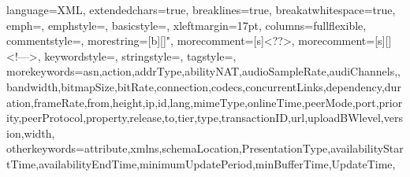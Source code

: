 \newcommand*{\chapnumfont}{%
  \usefont{T1}{pbk}{b}{n}
  \fontsize{150}{130}
  \selectfont
  \color{chaptergrey}
}
\makeatletter
\def\@makechapterhead#1{%
  \vspace*{50\p@}%
  {\parindent \z@ \raggedright \normalfont
    {\chapnumfont\ifnum \c@secnumdepth >\m@ne
        \raggedleft\bfseries \thechapter
        \par\nobreak
        \vskip 20\p@
    \fi}
    \interlinepenalty\@M
    {\raggedleft\Huge \bfseries #1\par\nobreak}
    \vskip 40\p@
  }}
\makeatother
\newcommand{\fancychapter}[1]{\chapter{#1}\vfill\minitoc\pagebreak}
%
\newcommand{\hlinew}[1]{%
  \noalign{\ifnum0=`}\fi\hrule \@height #1 \futurelet
   \reserved@a\@xhline}
%   
\def\Mark#1{\raisebox{0pt}[0pt][0pt]{\textsuperscript{\footnotesize\ensuremath{\ifcase#1\or *\or \dagger\or \ddagger\or%
    \mathsection\or \mathparagraph\or \|\or **\or \dagger\dagger%
    \or \ddagger\ddagger \else\textsuperscript{\expandafter\romannumeral#1}\fi}}}}
%
 {
	language=XML,
	extendedchars=true, 
	breaklines=true,
	breakatwhitespace=true,
	emph={},
	emphstyle=\color{red},
	basicstyle=\small,
	xleftmargin=17pt,
	columns=fullflexible,
	commentstyle=\color{gray}\upshape,
	morestring=[b][\color{brown}]",
	morecomment=[s]{<?}{?>},
	morecomment=[s][\color{forestgreen}]{<!--}{-->},
	keywordstyle=\color{orangered},
	stringstyle=\ttfamily\color{black},
	tagstyle=\color{blue},
	morekeywords={asn,action,addrType,abilityNAT,audioSampleRate,audiChannels,,bandwidth,bitmapSize,bitRate,connection,codecs,concurrentLinks,dependency,duration,frameRate,from,height,ip,id,lang,mimeType,onlineTime,peerMode,port,priority,peerProtocol,property,release,to,tier,type,transactionID,url,uploadBWlevel,version,width},
	otherkeywords={attribute,xmlns,schemaLocation,PresentationType,availabilityStartTime,availabilityEndTime,minimumUpdatePeriod,minBufferTime,UpdateTime},
}
